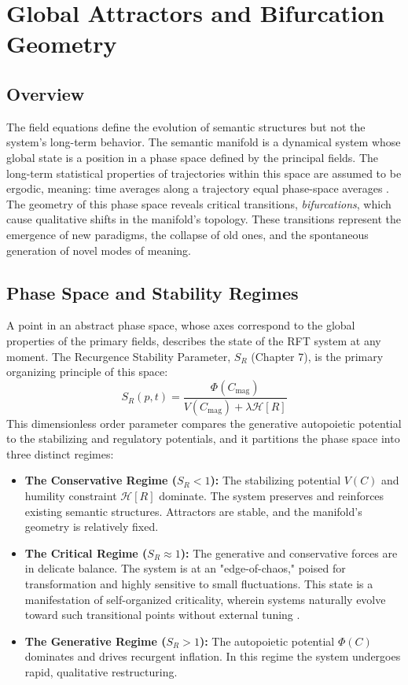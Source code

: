 \chapter{Global Attractors and Bifurcation Geometry}

\section{Overview}

The field equations define the evolution of semantic structures but not the system's long-term behavior. The semantic manifold is a dynamical system whose global state is a position in a phase space defined by the principal fields. The long-term statistical properties of trajectories within this space are assumed to be ergodic, meaning: time averages along a trajectory equal phase-space averages \autocite{Birkhoff1931}. The geometry of this phase space reveals critical transitions, \textit{bifurcations}, which cause qualitative shifts in the manifold's topology. These transitions represent the emergence of new paradigms, the collapse of old ones, and the spontaneous generation of novel modes of meaning.

\section{Phase Space and Stability Regimes}

A point in an abstract phase space, whose axes correspond to the global properties of the primary fields, describes the state of the RFT system at any moment. The Recurgence Stability Parameter, \(S_R\) (Chapter 7), is the primary organizing principle of this space:
\begin{equation}
S_R(p,t) = \frac{\Phi(C_{\mathrm{mag}})}{V(C_{\mathrm{mag}}) + \lambda \mathcal{H}[R]}
\end{equation}
This dimensionless order parameter compares the generative autopoietic potential to the stabilizing and regulatory potentials, and it partitions the phase space into three distinct regimes:
\begin{itemize}
    \item \textbf{The Conservative Regime (\(S_R < 1\)):} The stabilizing potential \(V(C)\) and humility constraint \(\mathcal{H}[R]\) dominate. The system preserves and reinforces existing semantic structures. Attractors are stable, and the manifold's geometry is relatively fixed.
    \item \textbf{The Critical Regime (\(S_R \approx 1\)):} The generative and conservative forces are in delicate balance. The system is at an "edge-of-chaos," poised for transformation and highly sensitive to small fluctuations. This state is a manifestation of self-organized criticality, wherein systems naturally evolve toward such transitional points without external tuning \autocite{BakTangWiesenfeld1987, Kauffman1993}.
    \item \textbf{The Generative Regime (\(S_R > 1\)):} The autopoietic potential \(\Phi(C)\) dominates and drives recurgent inflation. In this regime the system undergoes rapid, qualitative restructuring.
\end{itemize}

